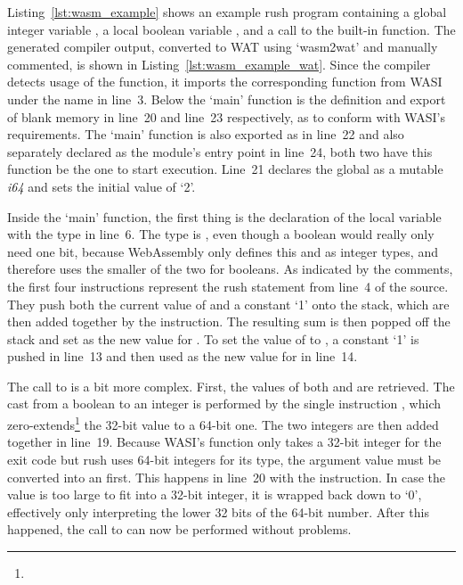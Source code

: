 Listing~\ref{lst:wasm_example} shows an example rush program containing a global integer variable , a local boolean variable , and a call to the built-in  function.
The generated compiler output, converted to WAT using `wasm2wat' and manually commented, is shown in Listing~\ref{lst:wasm_example_wat}.
Since the compiler detects usage of the  function, it imports the corresponding  function from WASI under the name  in line~3.
Below the `main' function is the definition and export of blank memory in line~20 and line~23 respectively, as to conform with WASI's requirements.
The `main' function is also exported as  in line~22 and also separately declared as the module's entry point in line~24, both two have this function be the one to start execution.
Line~21 declares the global  as a mutable \emph{i64} and sets the initial value of `2'.


Inside the `main' function, the first thing is the declaration of the local variable  with the type  in line~6.
The type is , even though a boolean would really only need one bit, because WebAssembly only defines this and  as integer types, and therefore uses the smaller of the two for booleans.
As indicated by the comments, the first four instructions represent the rush statement  from line~4 of the source.
They push both the current value of  and a constant `1' onto the stack, which are then added together by the  instruction.
The resulting sum is then popped off the stack and set as the new value for .
To set the value of  to , a constant `1' is pushed in line~13 and then used as the new value for  in line~14.

The call to  is a bit more complex.
First, the values of both  and  are retrieved.
The cast from a boolean to an integer is performed by the single instruction , which zero-extends\footnote{} the 32-bit value to a 64-bit one.
The two integers are then added together in line~19.
Because WASI's  function only takes a 32-bit integer for the exit code but rush uses 64-bit integers for its  type, the argument value must be converted into an  first.
This happens in line~20 with the  instruction.
In case the value is too large to fit into a 32-bit integer, it is wrapped back down to `0', effectively only interpreting the lower 32 bits of the 64-bit number.
After this happened, the call to  can now be performed without problems.


